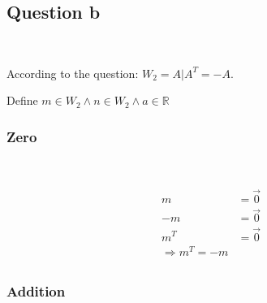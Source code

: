 \documentclass{article}
\def\R{\mathbb{R}}
\begin{document}
\subsection{Question b}

~

According to the question: $W_2={A | A^{T}=-A} $.

Define $m\in W_2 \land n \in W_2\land a\in \R$

\subsubsection{Zero}

~

\begin{equation}
\tag{1.2.1}
\begin{split}
m &= \overrightarrow{0}\\
-m &= \overrightarrow{0}\\
m^T &= \overrightarrow{0}\\
\Rightarrow m^T=-m\\
\end{split}
\end{equation}


\subsubsection{Addition}

~
\end{document}
